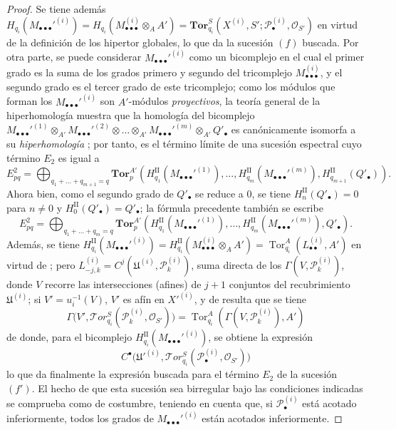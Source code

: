 \begin{proof}
Se tiene además
$H_{q_i}(M_{\bullet\bullet\bullet}'^{(i)})
=H_{q_i}(M_{\bullet\bullet\bullet}^{(i)}\otimes_A A')
=\mathbf{Tor}_{q_i}^S
(X^{(i)},S';\mathscr P_\bullet^{(i)},\mathscr O_{S'})$
en virtud de la definición de los hipertor globales, lo que da la sucesión
$(f)$ buscada. Por otra parte, se puede considerar
$M_{\bullet\bullet\bullet}'^{(i)}$ como un bicomplejo en el cual el primer
grado es la suma de los grados primero y segundo del tricomplejo
$M_{\bullet\bullet\bullet}^{(i)}$, y el segundo grado es el tercer grado de
este tricomplejo; como los módulos que forman los
$M_{\bullet\bullet\bullet}'^{(i)}$ son $A'$-módulos \emph{proyectivos}, la teoría
general de la hiperhomología muestra que la homología del bicomplejo
$M_{\bullet\bullet\bullet}'^{(1)}\otimes_{A'}
M_{\bullet\bullet\bullet}'^{(2)}\otimes\ldots\otimes_{A'}
M_{\bullet\bullet\bullet}'^{(m)}\otimes_{A'} Q'_\bullet$
es canónicamente isomorfa a su \emph{hiperhomología} ; por tanto,
es el término límite de una sucesión espectral cuyo término $E_2$ es igual a
\[
  E_{pq}^2
  =\bigoplus_{q_1+\ldots+q_{m+1}=q}
  \mathbf{Tor}_p^{A'}
  (H_{q_1}^{\mathrm{II}}(M_{\bullet\bullet\bullet}'^{(1)}),\ldots,
   H_{q_m}^{\mathrm{II}}(M_{\bullet\bullet\bullet}'^{(m)}),
   H_{q_{m+1}}^{\mathrm{II}}(Q'_\bullet)).
\]
Ahora bien, como el segundo grado de $Q'_\bullet$ se reduce a $0$, se tiene
$H_n^{\mathrm{II}}(Q'_\bullet)=0$ para $n\ne0$ y
$H_0^{\mathrm{II}}(Q'_\bullet)=Q'_\bullet$; la fórmula precedente también
se escribe
\[
  E_{pq}^2
  =\bigoplus_{q_1+\ldots+q_m=q}
  \mathbf{Tor}_p^{A'}
  (H_{q_1}^{\mathrm{II}}(M_{\bullet\bullet\bullet}'^{(1)}),\ldots,
   H_{q_m}^{\mathrm{II}}(M_{\bullet\bullet\bullet}'^{(m)}),Q'_\bullet).
\]
Además, se tiene
$H_{q_i}^{\mathrm{II}}(M_{\bullet\bullet\bullet}'^{(i)})
=H_{q_i}^{\mathrm{II}}(M_{\bullet\bullet\bullet}^{(i)}\otimes_A A')
=\operatorname{Tor}_{q_i}^A(L_{\bullet\bullet}^{(i)},A')$
en virtud de ; pero
$L_{-j,k}^{(i)}=C^j(\mathfrak U^{(i)},\mathscr P_k^{(i)})$, suma directa de
los $\Gamma(V,\mathscr P_k^{(i)})$, donde $V$ recorre las intersecciones
(afines) de $j+1$ conjuntos del recubrimiento $\mathfrak U^{(i)}$; si
$V'=u_i^{-1}(V)$, $V'$ es afín en $X'^{(i)}$, y de
 resulta que se tiene
\[
  \Gamma\bigl(V',\mathscr{T}\!or_{q_i}^S
  (\mathscr P_k^{(i)},\mathscr O_{S'})\bigr)
  =\operatorname{Tor}_{q_i}^A(\Gamma(V,\mathscr P_k^{(i)}),A')
\]
de donde, para el bicomplejo
$H_{q_i}^{\mathrm{II}}(M_{\bullet\bullet\bullet}'^{(i)})$, se obtiene la
expresión
\[
  C^\bullet\bigl(\mathfrak U'^{(i)},
  \mathscr{T}\!or_{q_i}^S(\mathscr P_\bullet^{(i)},\mathscr O_{S'})\bigr)
\]
lo que da finalmente la expresión buscada para el término $E_2$ de la
sucesión $(f')$. El hecho de que esta sucesión sea birregular bajo las
condiciones indicadas se comprueba como de costumbre, teniendo en cuenta que,
si $\mathscr P_\bullet^{(i)}$ está acotado inferiormente, todos los grados de
$M_{\bullet\bullet\bullet}'^{(i)}$ están acotados inferiormente.
\end{proof}

